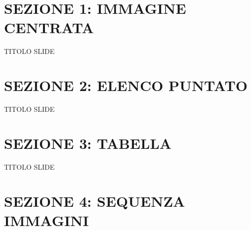 \documentclass[aspectratio=1610]{beamer}
\begin{document}
\section{SEZIONE 1: IMMAGINE CENTRATA}

\begin{frame}{TITOLO SLIDE}
\end{frame}

\section{SEZIONE 2: ELENCO PUNTATO}

\begin{frame}{TITOLO SLIDE}
\end{frame}

\section{SEZIONE 3: TABELLA}

\begin{frame}{TITOLO SLIDE}
\end{frame}

\section{SEZIONE 4: SEQUENZA IMMAGINI}
\end{document}
